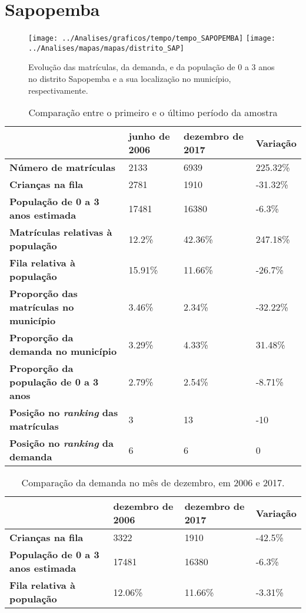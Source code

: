 \section{Sapopemba}
\begin{figure}[H]
	\centering
	\texttt{[image: ../Analises/graficos/tempo/tempo\_SAPOPEMBA]}
	\texttt{[image: ../Analises/mapas/mapas/distrito\_SAP]}
	\caption{Evolução das matrículas, da demanda, e da população de 0 a 3 anos no distrito Sapopemba e a sua localização no município, respectivamente.}
\end{figure}
\begin{table}[H]
	\begin{tabular}{|l|l|l|l|}
		\hline
		\textbf{}                                      & \textbf{junho de 2006}       & \textbf{dezembro de 2017}    & \textbf{Variação} \\ \hline
		\textbf{Número de matrículas}                  & 2133 & 6939 & 225.32\% \\ \hline
		\textbf{Crianças na fila}                      & 2781 & 1910 & -31.32\% \\ \hline
		\textbf{População de 0 a 3 anos estimada}      & 17481 & 16380 & -6.3\% \\ \hline
		\textbf{Matrículas relativas à população}      & 12.2\% & 42.36\% & 247.18\% \\ \hline
		\textbf{Fila relativa à população}             & 15.91\% & 11.66\% & -26.7\% \\ \hline
		\textbf{Proporção das matrículas no município} & 3.46\% & 2.34\% & -32.22\% \\ \hline
		\textbf{Proporção da demanda no município}     & 3.29\% & 4.33\% & 31.48\% \\ \hline
		\textbf{Proporção da população de 0 a 3 anos}  & 2.79\% & 2.54\% & -8.71\% \\ \hline
		\textbf{Posição no \textit{ranking} das matrículas}     & 3 & 13 & -10 \\ \hline
		\textbf{Posição no \textit{ranking} da demanda}         & 6 & 6 & 0 \\ \hline
	\end{tabular}
	\caption{Comparação entre o primeiro e o último período da amostra}
\end{table}
\begin{table}[H]
	\begin{tabular}{|l|l|l|l|}
		\hline
		\textbf{}                                 & \textbf{dezembro de 2006} & \textbf{dezembro de 2017} & \textbf{Variação} \\ \hline
		\textbf{Crianças na fila}                      & 3322 & 1910 & -42.5\% \\ \hline
		\textbf{População de 0 a 3 anos estimada}      & 17481 & 16380 & -6.3\% \\ \hline
		\textbf{Fila relativa à população}             & 12.06\% & 11.66\% & -3.31\% \\ \hline
	\end{tabular}
	\caption{Comparação da demanda no mês de dezembro, em 2006 e 2017.}
\end{table}
